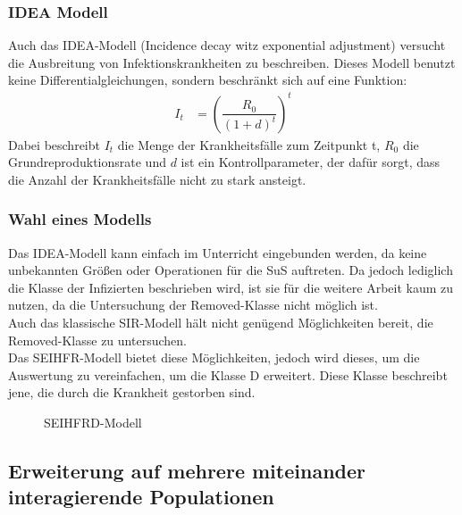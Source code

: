 \subsubsection{IDEA Modell}
\ellen
Auch das IDEA-Modell (Incidence decay witz exponential adjustment) versucht die Ausbreitung von Infektionskrankheiten zu beschreiben. Dieses Modell benutzt keine Differentialgleichungen, sondern beschränkt sich auf eine Funktion:\\
\begin{align}
I_t &=(\dfrac{R_0}{(1+d)^t})^t
\end{align}
Dabei beschreibt $I_t$ die Menge der Krankheitsfälle zum Zeitpunkt t, $R_0$ die Grundreproduktionsrate und $d$ ist ein Kontrollparameter, der dafür sorgt, dass die Anzahl der Krankheitsfälle nicht zu stark ansteigt. 
\subsubsection{Wahl eines Modells}
Das IDEA-Modell kann einfach im Unterricht eingebunden werden, da keine unbekannten Größen oder Operationen für die SuS auftreten. Da jedoch lediglich die Klasse der Infizierten beschrieben wird, ist sie für die weitere Arbeit kaum zu nutzen, da die Untersuchung der Removed-Klasse nicht möglich ist.\\
 Auch das klassische SIR-Modell hält nicht genügend Möglichkeiten bereit, die Removed-Klasse zu untersuchen.\\
  Das SEIHFR-Modell bietet diese Möglichkeiten, jedoch wird dieses, um die Auswertung zu vereinfachen, um die Klasse D erweitert. Diese Klasse beschreibt jene, die durch die Krankheit gestorben sind. 
  \begin{figure}
\begin{center}
\end{center}
\caption{SEIHFRD-Modell}
\end{figure}
\subsection{Erweiterung auf mehrere miteinander interagierende Populationen}\label{ssec:multiPop}
\steffen

